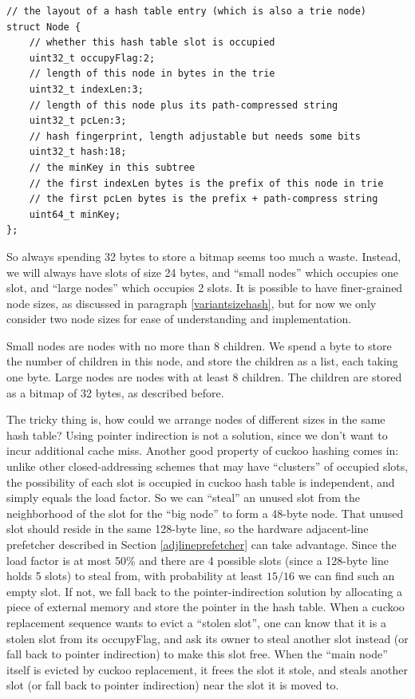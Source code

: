 \documentclass[11pt, usletter]{article}
\begin{document}
\singlespacing\begin{codebox}
\begin{verbatim}
// the layout of a hash table entry (which is also a trie node)
struct Node {
    // whether this hash table slot is occupied
    uint32_t occupyFlag:2; 
    // length of this node in bytes in the trie
    uint32_t indexLen:3;
    // length of this node plus its path-compressed string
    uint32_t pcLen:3;
    // hash fingerprint, length adjustable but needs some bits
    uint32_t hash:18;
    // the minKey in this subtree
    // the first indexLen bytes is the prefix of this node in trie
    // the first pcLen bytes is the prefix + path-compress string
    uint64_t minKey;
};  
\end{verbatim}
\end{codebox}\doublespacing

So always spending 32 bytes to store a bitmap seems too much a waste. 
Instead, we will always have slots of size 24 bytes, 
and ``small nodes'' which occupies one slot, and ``large nodes'' which occupies 2 slots. 
It is possible to have finer-grained node sizes, as discussed in paragraph \ref{variantsizehash}, 
but for now we only consider two node sizes for ease of understanding and implementation.

Small nodes are nodes with no more than 8 children.
We spend a byte to store the number of children in this node, 
and store the children as a list, each taking one byte. 
Large nodes are nodes with at least 8 children. 
The children are stored as a bitmap of 32 bytes, as described before.

The tricky thing is, how could we arrange nodes of different sizes in the same hash table?
Using pointer indirection is not a solution, since we don't want to incur additional cache miss. 
Another good property of cuckoo hashing comes in: 
unlike other closed-addressing schemes that may have ``clusters'' of occupied slots, 
the possibility of each slot is occupied in cuckoo hash table is independent, 
and simply equals the load factor. 
So we can ``steal'' an unused slot from the neighborhood of the slot for the ``big node'' to form a 48-byte node. 
That unused slot should reside in the same 128-byte line,
so the hardware adjacent-line prefetcher described in Section \ref{adjlineprefetcher} can take advantage.
Since the load factor is at most 50\% and there are 4 possible slots (since a 128-byte line holds 5 slots) to steal from, 
with probability at least $15/16$ we can find such an empty slot. If not, we fall back to the pointer-indirection solution
by allocating a piece of external memory and store the pointer in the hash table. 
When a cuckoo replacement sequence wants to evict a ``stolen slot'', one can know that it is a stolen slot 
from its occupyFlag, and ask its owner to steal another slot instead (or fall back to pointer indirection) to make this slot free.  
When the ``main node'' itself is evicted by cuckoo replacement, it frees the slot it stole, 
and steals another slot (or fall back to pointer indirection) near the slot it is moved to.
 
\end{document}
